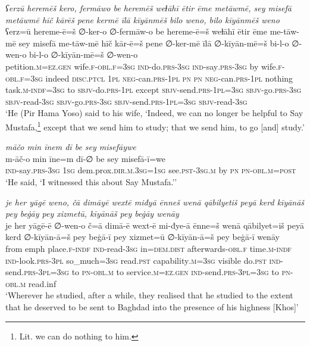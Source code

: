 \ea \label{ŽP.72}
\textit{ʕerzū heremēš kero, fermāwo be heremēš weɫāhī ētir ēme metāwmē, sey misefā metāwmē hīč kārēš pene kermē īlā kīyānmēš bilo weno, bilo kīyānmēš weno} \\ 
\gll ʕerz=ū hereme-ē=š ∅-ker-o ∅-fermāw-o be hereme-ē=š weɫāhī ētir ēme me-tāw-mē sey misefā me-tāw-mē hīč kār-ē=š pene ∅-ker-mē īlā ∅-kīyān-mē=š bi-l-o ∅-wen-o bi-l-o ∅-kīyān-mē=š ∅-wen-o \\ 
 petition\textsc{.m}\textsc{\textsc{=ez.gen}} wife\textsc{.f}\textsc{-obl}\textsc{.f}\textsc{=3sg} \textsc{ind-}do\textsc{.prs}\textsc{-3sg} \textsc{ind-}say\textsc{.prs}\textsc{-3sg} by wife\textsc{.f}\textsc{-obl}\textsc{.f}\textsc{=3sg} indeed \textsc{disc.ptcl} \textsc{1pl} \textsc{neg-}can\textsc{.prs}\textsc{-1pl} \textsc{pn} \textsc{pn} \textsc{neg-}can\textsc{.prs}\textsc{-1pl} nothing task\textsc{.m}\textsc{-indf}\textsc{=3sg} to \textsc{sbjv-}do\textsc{.prs}\textsc{-1pl} except \textsc{sbjv-}send\textsc{.prs}\textsc{-1pl}\textsc{=3sg} \textsc{sbjv-}go\textsc{.prs}\textsc{-3sg} \textsc{sbjv-}read\textsc{-3sg} \textsc{sbjv-}go\textsc{.prs}\textsc{-3sg} \textsc{sbjv-}send\textsc{.prs}\textsc{-1pl}\textsc{=3sg} \textsc{sbjv-}read\textsc{-3sg} \\ 
\glt `He (Pir Hama Yoso) said to his wife, ‘Indeed, we can no longer be helpful to Say Mustafa,\footnote{Lit. we can do nothing to him.} except that we send him to study; that we send him, to go [and] study.'
\z 
 
\ea \label{ŽP.74}
\textit{māčo min īnem dī be sey misefāywe} \\ 
\gll m-āč-o min īne=m dī-∅ be sey misefā-ī=we \\ 
 \textsc{ind-}say\textsc{.prs}\textsc{-3sg} \textsc{1sg} dem.prox\textsc{.dir}\textsc{.m}\textsc{.3sg}\textsc{=\textsc{1sg}} see\textsc{.pst}\textsc{-3sg}\textsc{.m} by \textsc{pn} \textsc{pn}\textsc{-obl}\textsc{.m}\textsc{=\textsc{post}} \\ 
\glt `He said, ‘I witnessed this about Say Mustafa.’'
\z 
 
\ea \label{ŽP.80}
\textit{je her yāgē weno, čā dimāyē wextē miđyā ēnneš wenā qābilyetiš peyā kerd kīyānāš pey beġāy pey xizmetū, kīyānāš pey beġāy wenāy} \\ 
\gll je her yāgē-ē ∅-wen-o č=ā dimā-ē wext-ē mi-đye-ā ēnne=š wenā qābilyet=iš peyā kerd ∅-kīyān-ā=š pey beġā-ī pey xizmet=ū ∅-kīyān-ā=š pey beġā-ī wenāy \\ 
 from emph place\textsc{.f}\textsc{-indf} \textsc{ind-}read\textsc{-3sg} in=\textsc{dem.dist} afterwards\textsc{-obl}\textsc{.f} time\textsc{.m}\textsc{-indf} \textsc{ind-}look\textsc{.prs}\textsc{-3pl} so\_much\textsc{=3sg} read\textsc{.pst} capability\textsc{.m}\textsc{=3sg} visible do\textsc{.pst} \textsc{ind-}send\textsc{.prs}\textsc{-3pl}\textsc{=3sg} to \textsc{pn}\textsc{-obl}\textsc{.m} to service\textsc{.m}\textsc{\textsc{=ez.gen}} \textsc{ind-}send\textsc{.prs}\textsc{-3pl}\textsc{=3sg} to \textsc{pn}\textsc{-obl}\textsc{.m} read.inf \\ 
\glt `Wherever he studied, after a while, they realised that he studied to the extent that he deserved to be sent to Baghdad into the presence of his highness [Khos]'
\z 
 
